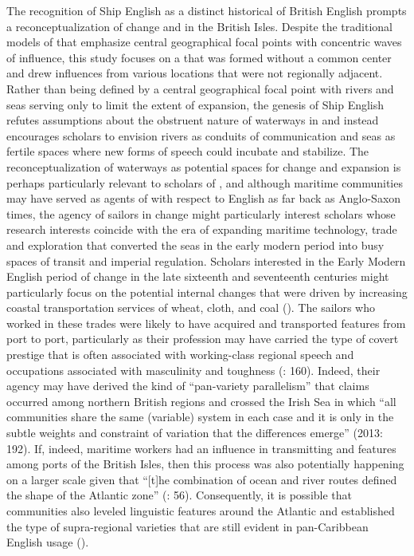The recognition of Ship English as a distinct historical  of British English prompts a reconceptualization of  change and  in the British Isles. Despite the traditional models of  that emphasize central geographical focal points with concentric waves of influence, this study focuses on a  that was formed without a common center and drew influences from various locations that were not regionally adjacent. Rather than being defined by a central geographical focal point with rivers and seas serving only to limit the extent of  expansion, the genesis of Ship English refutes assumptions about the obstruent nature of waterways in  and instead encourages scholars to envision rivers as conduits of communication and seas as fertile spaces where new forms of speech could incubate and stabilize. The reconceptualization of waterways as potential spaces for  change and expansion is perhaps particularly relevant to scholars of , and although maritime communities may have served as agents of  with respect to English as far back as Anglo-Saxon times, the agency of sailors in  change might particularly interest scholars whose research interests coincide with the era of expanding maritime technology, trade and exploration that converted the seas in the early modern period into busy spaces of transit and imperial regulation. Scholars interested in the Early Modern English period of  change in the late sixteenth and seventeenth centuries might particularly focus on the potential internal changes that were driven by increasing coastal transportation services of wheat, cloth, and coal (\citealt{Willan1967}). The sailors who worked in these trades were likely to have acquired and transported  features from port to port, particularly as their profession may have carried the type of covert prestige that is often associated with working-class regional speech and occupations associated with masculinity and toughness (\citealt{Petyt1980}: 160). Indeed, their agency may have derived the kind of “pan-variety parallelism” that \citeauthor{Tagliamonte2013} claims occurred among northern British regions and crossed the Irish Sea in which “all communities share the same (variable) system in each case and it is only in the subtle weights and constraint of variation that the differences emerge” (2013: 192). If, indeed, maritime workers had an influence in transmitting and   features among ports of the British Isles, then this process was also potentially happening on a larger scale given that “[t]he combination of ocean and river routes defined the shape of the Atlantic zone” (\citealt{Thornton2000}: 56). Consequently, it is possible that  communities also leveled linguistic features around the Atlantic and established the type of supra-regional varieties that are still evident in pan-Caribbean English usage (\citealt{Allsopp2003}).  

